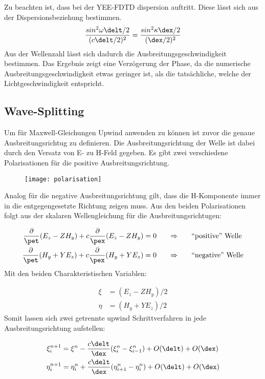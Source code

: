 Zu beachten ist, dass bei der YEE-FDTD dispersion auftritt. Diese l\"asst sich aus der Dispersionsbeziehung bestimmen.
\begin{equation*}
	\frac{sin^2\omega\delt/2}{(c\delt/2)^2} = \frac{sin^2\kappa\dex/2}{(\dex/2)^2}
\end{equation*}
Aus der Wellenzahl l\"asst sich dadurch die Ausbreitungsgeschwindigkeit bestimmen. Das Ergebnis zeigt eine Verz\"ogerung der Phase, da die numerische Ausbreitungsgeschwindigkeit etwas geringer ist, als die tats\"achliche, welche der Lichtgeschwindigkeit entspricht.

\newpage

\subsection{Wave-Splitting}
Um f\"ur Maxwell-Gleichungen Upwind anwenden zu k\"onnen ist zuvor die genaue Ausbreitungsrichtug zu definieren. Die Ausbreitungsrichtung der Welle ist dabei durch den Versatz von E- zu H-Feld gegeben. Es gibt zwei verschiedene Polarisationen f\"ur die positive Ausbreitungsrichtung.
\par
\begin{figure}[ht]
	\centering
	\texttt{[image: polarisation]}
\end{figure}
Analog f\"ur die negative Ausbreitungsrichtung gilt, dass die H-Komponente immer in die entgegengesetzte Richtung zeigen muss. Aus den beiden Polarisationen folgt aus der skalaren Wellengleichung f\"ur die Ausbreitungsrichtugen:
\par
\begin{align*}
	\frac{\partial}{\pet}(E_z - ZH_y) + c\frac{\partial}{\pex}(E_z - ZH_y) &= 0~~~~~\Rightarrow~~~~~\textrm{``positive'' Welle} \\
	\frac{\partial}{\pet}(H_y + YE_z) + c\frac{\partial}{\pex}(H_y + YE_z) &= 0~~~~~\Rightarrow~~~~~\textrm{``negative'' Welle} 
\end{align*}
Mit den beiden Charakteristischen Variablen:
\par
\begin{align*}
	\xi &= (E_z - ZH_y)/2 \\
	\eta &= (H_y + YE_z)/2
\end{align*}
Somit lassen sich zwei getrennte upwind Schrittverfahren in jede Ausbreitungsrichtung aufstellen:
\par
\begin{align*}
	\xi^{n+1}_i &= \xi^{n} - \frac{c\delt}{\dex}(\xi^n_i - \xi^n_{i-1}) + O(\delt) + O(\dex) \\
	\eta^{n+1}_i &= \eta^n_i + \frac{c\delt}{\dex}(\eta^n_{i+1} - \eta^n_i) + O(\delt) + O(\dex)
\end{align*}

